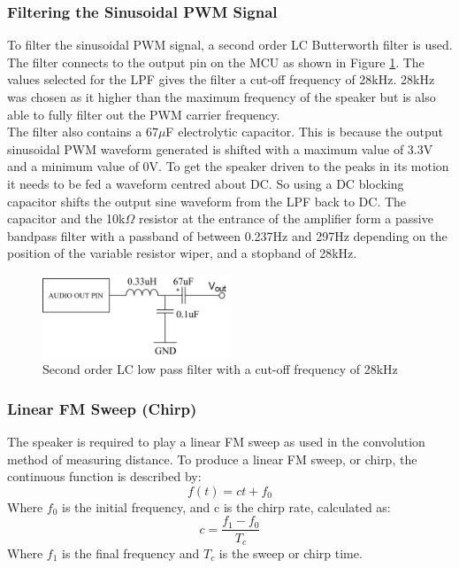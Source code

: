 \documentclass[12pt, a4paper]{article}
\begin{document}
\subsubsection{Filtering the Sinusoidal PWM Signal}
\label{sec:L_Low_Pass_Filter}
To filter the sinusoidal PWM signal, a second order LC Butterworth filter is used. The filter connects to the output pin on the MCU as shown in Figure \ref{fig:L_LPF}. The values selected for the LPF gives the filter a cut-off frequency of 28kHz. 28kHz was chosen as it higher than the maximum frequency of the speaker but is also able to fully filter out the PWM carrier frequency. \\

The filter also contains a 67$\mu$F electrolytic capacitor. This is because the output sinusoidal PWM waveform generated is shifted with a maximum value of 3.3V and a minimum value of 0V. To get the speaker driven to the peaks in its motion it needs to be fed a waveform centred about DC. So using a DC blocking capacitor shifts the output sine waveform from the LPF back to DC. The capacitor and the 10k$\Omega$ resistor at the entrance of the amplifier form a passive bandpass filter with a passband of between 0.237Hz and 297Hz depending on the position of the variable resistor wiper, and a stopband of 28kHz. \\
\begin{figure} [!htb]
	\hfill\includegraphics[width=0.5\textwidth]{./images/speaker/L_LPF}\hspace{\fill}
	\caption{Second order LC low pass filter with a cut-off frequency of 28kHz}
	\label{fig:L_LPF}
\end{figure} 

\subsubsection{Linear FM Sweep (Chirp)}
\label{sec:L_Chirps}
The speaker is required to play a linear FM sweep as used in the convolution method of measuring distance. To produce a linear FM sweep, or chirp, the continuous function is described by:
\begin{equation}
	f(t) = ct + f_0
	\label{eqn:Chirp1}
\end{equation}
Where $f_0$ is the initial frequency, and c is the chirp rate, calculated as:
\begin{equation}
	c = \frac{f_1 - f_0}{T_c}
\end{equation}
Where $f_1$ is the final frequency and $T_c$ is the sweep or chirp time. \\
\end{document}
